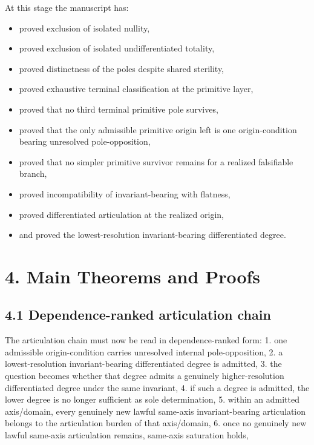 \documentclass[11pt]{article}
\begin{document}
At this stage the manuscript has:

\begin{itemize}
\item
  proved exclusion of isolated nullity,
\item
  proved exclusion of isolated undifferentiated totality,
\item
  proved distinctness of the poles despite shared sterility,
\item
  proved exhaustive terminal classification at the primitive layer,
\item
  proved that no third terminal primitive pole survives,
\item
  proved that the only admissible primitive origin left is one origin-condition bearing unresolved pole-opposition,
\item
  proved that no simpler primitive survivor remains for a realized falsifiable branch,
\item
  proved incompatibility of invariant-bearing with flatness,
\item
  proved differentiated articulation at the realized origin,
\item
  and proved the lowest-resolution invariant-bearing differentiated degree.
\end{itemize}

\section{4. Main Theorems and Proofs}\label{main-theorems-and-proofs}

\subsection{4.1 Dependence-ranked articulation chain}\label{dependence-ranked-articulation-chain}

The articulation chain must now be read in dependence-ranked form: 1. one admissible origin-condition carries unresolved internal pole-opposition, 2. a lowest-resolution invariant-bearing differentiated degree is admitted, 3. the question becomes whether that degree admits a genuinely higher-resolution differentiated degree under the same invariant, 4. if such a degree is admitted, the lower degree is no longer sufficient as sole determination, 5. within an admitted axis/domain, every genuinely new lawful same-axis invariant-bearing articulation belongs to the articulation burden of that axis/domain, 6. once no genuinely new lawful same-axis articulation remains, same-axis saturation holds,
\end{document}
